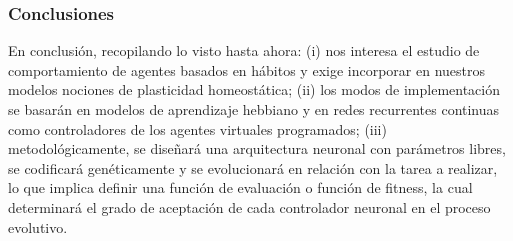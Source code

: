 \subsubsection{Conclusiones}
En conclusión, recopilando lo visto hasta ahora: (i) nos interesa el estudio de comportamiento de agentes basados en hábitos y exige incorporar en nuestros modelos nociones de plasticidad homeostática; (ii) los modos de implementación se basarán en modelos de aprendizaje hebbiano y en redes recurrentes continuas como controladores de los agentes virtuales programados; (iii) metodológicamente, se diseñará una arquitectura neuronal con parámetros libres, se codificará genéticamente y se evolucionará en relación con la tarea a realizar, lo que implica definir una función de evaluación o función de fitness, la cual determinará el grado de aceptación de cada controlador neuronal en el proceso evolutivo.
